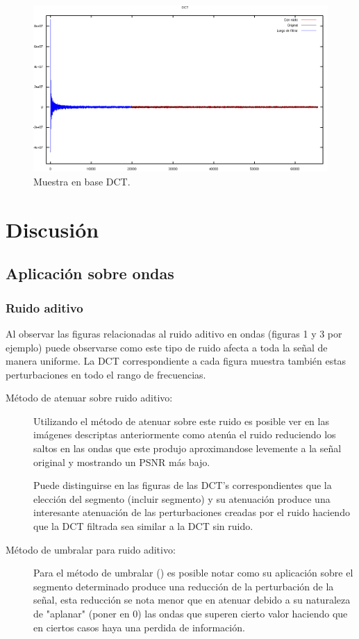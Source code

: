 \documentclass[a4paper,10pt,twoside]{article}
\begin{document}
\begin{figure}[H]
  \centering
  \includegraphics[width=15cm]{graficos/lena_impulsivo_umbralizar_dct.png} 
  \caption{Muestra en base DCT.}
\end{figure}


\section{Discusión}
\subsection{Aplicación sobre ondas}
\subsubsection{Ruido aditivo}
Al observar las figuras relacionadas al ruido aditivo en ondas (figuras 1 y 3 por ejemplo) puede observarse como este tipo de ruido afecta a toda la señal de manera uniforme. La DCT correspondiente a cada figura muestra también estas perturbaciones en todo el rango de frecuencias.
\begin{description}
\item[Método de atenuar sobre ruido aditivo:]
Utilizando el método de atenuar sobre este ruido es posible ver en las imágenes descriptas anteriormente como atenúa el ruido reduciendo los saltos en las ondas que este  produjo aproximandose levemente a la señal original y mostrando un PSNR más bajo.

Puede distinguirse en las figuras de las DCT's correspondientes que la elección del segmento (incluir segmento) y su atenuación produce una interesante atenuación de las perturbaciones creadas por el ruido haciendo que la DCT filtrada sea similar a la DCT sin ruido.
\item[Método de umbralar para ruido aditivo:]
Para el método de umbralar () es posible notar como su aplicación sobre el segmento determinado produce una reducción de la perturbación de la señal, esta reducción se nota menor que en atenuar debido a su naturaleza de "aplanar" (poner en 0) las ondas que superen cierto valor haciendo que en ciertos casos haya una perdida de información.
\end{description}
\end{document}
